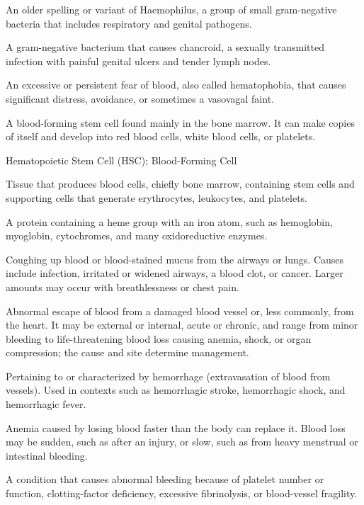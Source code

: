  An older spelling or variant of Haemophilus, a group of small gram-negative bacteria that includes respiratory and genital pathogens.

 A gram-negative bacterium that causes chancroid, a sexually transmitted infection with painful genital ulcers and tender lymph nodes.

 An excessive or persistent fear of blood, also called hematophobia, that causes significant distress, avoidance, or sometimes a vasovagal faint.

 A blood-forming stem cell found mainly in the bone marrow. It can make copies of itself and develop into red blood cells, white blood cells, or platelets.

\synonyms
Hematopoietic Stem Cell (HSC); Blood-Forming Cell

 Tissue that produces blood cells, chiefly bone marrow, containing stem cells and supporting cells that generate erythrocytes, leukocytes, and platelets.

 A protein containing a heme group with an iron atom, such as hemoglobin, myoglobin, cytochromes, and many oxidoreductive enzymes.

 Coughing up blood or blood-stained mucus from the airways or lungs. Causes include infection, irritated or widened airways, a blood clot, or cancer. Larger amounts may occur with breathlessness or chest pain.

 Abnormal escape of blood from a damaged blood vessel or, less commonly, from the heart. It may be external or internal, acute or chronic, and range from minor bleeding to life-threatening blood loss causing anemia, shock, or organ compression; the cause and site determine management.

 Pertaining to or characterized by hemorrhage (extravasation of blood from vessels). Used in contexts such as hemorrhagic stroke, hemorrhagic shock, and hemorrhagic fever.

 Anemia caused by losing blood faster than the body can replace it. Blood loss may be sudden, such as after an injury, or slow, such as from heavy menstrual or intestinal bleeding.

 A condition that causes abnormal bleeding because of platelet number or function, clotting-factor deficiency, excessive fibrinolysis, or blood-vessel fragility.


